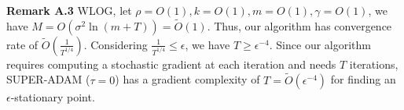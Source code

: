 \documentclass{article}
\begin{document}
\textbf{Remark A.3} \label{rmka3} WLOG, let $\rho = O(1), k = O(1), m = O(1), \gamma = O(1)$, we have $M = O(\sigma^2 \ln(m+T)) = \tilde{O}(1)$. Thus, our algorithm has convergence rate of $\tilde{O}\left(\frac{1}{T^{1/4}}\right)$.
Considering $\frac{1}{T^{1/4}}\leq\epsilon$, we have $T\geq\epsilon^{-4}$. Since our algorithm requires computing a stochastic gradient at each iteration and needs $T$ iterations, SUPER-ADAM ($\tau = 0$) has a gradient complexity of $T = \tilde{O}(\epsilon^{-4})$ for finding an
$\epsilon$-stationary point.
\end{document}
